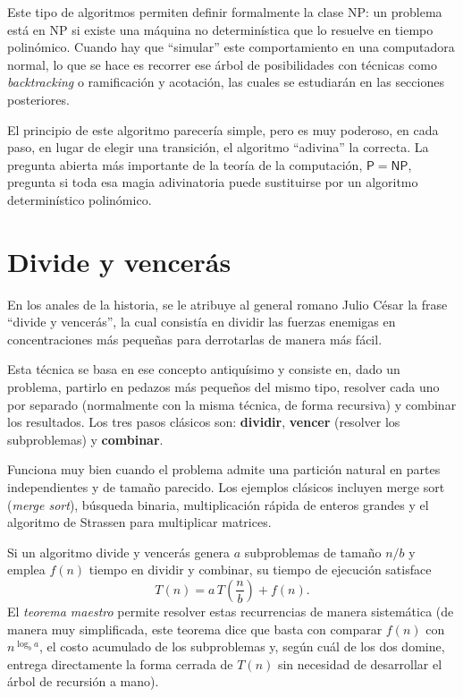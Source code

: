 \documentclass[12pt,letterpaper]{article}
\begin{document}
Este tipo de algoritmos permiten definir formalmente la clase \textsf{NP}: un 
problema está en \textsf{NP} si existe una máquina no determinística que lo 
resuelve en tiempo polinómico. Cuando hay que ``simular'' este comportamiento 
en una computadora normal, lo que se hace es recorrer ese árbol de 
posibilidades con técnicas como \emph{backtracking} o ramificación y acotación,
las cuales se estudiarán en las secciones posteriores.

El principio de este algoritmo parecería simple, pero es muy poderoso, en cada 
paso, en lugar de elegir una transición, el algoritmo ``adivina'' la correcta. 
La pregunta abierta más importante de la teoría de la computación, 
$\mathsf{P}=\mathsf{NP}$, pregunta si toda esa magia adivinatoria puede 
sustituirse por un algoritmo determinístico polinómico.

\section{Divide y vencerás}
\label{sec:dyv}

En los anales de la historia, se le atribuye al general romano Julio César la 
frase ``divide y vencerás'', la cual consistía en dividir las fuerzas enemigas 
en concentraciones más pequeñas para derrotarlas de manera más fácil.

Esta técnica 
se basa en ese concepto antiquísimo y consiste en, dado un problema, partirlo 
en pedazos más pequeños del mismo tipo, resolver cada uno por separado 
(normalmente con la misma técnica, de forma recursiva) y combinar los 
resultados. Los tres pasos clásicos son: \textbf{dividir}, \textbf{vencer} 
(resolver los subproblemas) y \textbf{combinar}.

Funciona muy bien cuando el problema admite una partición natural en partes 
independientes y de tamaño parecido. Los ejemplos clásicos incluyen merge sort
(\emph{merge sort}), búsqueda binaria, multiplicación 
rápida de enteros grandes y el algoritmo de Strassen para multiplicar matrices.

Si un algoritmo divide y vencerás genera $a$ subproblemas de tamaño $n/b$ y 
emplea $f(n)$ tiempo en dividir y combinar, su tiempo de ejecución satisface
\begin{equation*}
    T(n) = a\,T\!\left(\frac{n}{b}\right) + f(n).
\end{equation*}
El \emph{teorema maestro} permite resolver estas recurrencias de manera
sistemática (de manera muy simplificada, este teorema dice que basta con 
comparar $f(n)$ con $n^{\log_b a}$, el costo acumulado de los subproblemas y, 
según cuál de los dos domine, entrega directamente la forma cerrada de $T(n)$ 
sin necesidad de desarrollar el árbol de recursión a mano).
\end{document}
